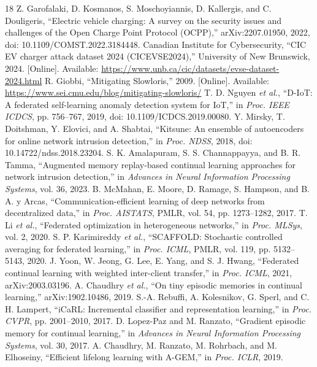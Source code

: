 \documentclass[journal,10pt]{IEEEtran}
\begin{document}
\begin{thebibliography}{18}
 Z. Garofalaki, D. Kosmanos, S. Moschoyiannis, D. Kallergis, and C. Douligeris, ``Electric vehicle charging: A survey on the security issues and challenges of the Open Charge Point Protocol (OCPP),'' arXiv:2207.01950, 2022, doi: 10.1109/COMST.2022.3184448.
 Canadian Institute for Cybersecurity, ``CIC EV charger attack dataset 2024 (CICEVSE2024),'' University of New Brunswick, 2024. [Online]. Available: \url{https://www.unb.ca/cic/datasets/evse-dataset-2024.html}
 R. Giobbi, ``Mitigating Slowloris,'' 2009. [Online]. Available: \url{https://www.sei.cmu.edu/blog/mitigating-slowloris/}
 T. D. Nguyen \emph{et al.}, ``D-IoT: A federated self-learning anomaly detection system for IoT,'' in \emph{Proc. IEEE ICDCS}, pp. 756--767, 2019, doi: 10.1109/ICDCS.2019.00080.
 Y. Mirsky, T. Doitshman, Y. Elovici, and A. Shabtai, ``Kitsune: An ensemble of autoencoders for online network intrusion detection,'' in \emph{Proc. NDSS}, 2018, doi: 10.14722/ndss.2018.23204.
 S. K. Amalapuram, S. S. Channappayya, and B. R. Tamma, ``Augmented memory replay-based continual learning approaches for network intrusion detection,'' in \emph{Advances in Neural Information Processing Systems}, vol. 36, 2023.
 B. McMahan, E. Moore, D. Ramage, S. Hampson, and B. A. y Arcas, ``Communication-efficient learning of deep networks from decentralized data,'' in \emph{Proc. AISTATS}, PMLR, vol. 54, pp. 1273--1282, 2017.
 T. Li \emph{et al.}, ``Federated optimization in heterogeneous networks,'' in \emph{Proc. MLSys}, vol. 2, 2020.
 S. P. Karimireddy \emph{et al.}, ``SCAFFOLD: Stochastic controlled averaging for federated learning,'' in \emph{Proc. ICML}, PMLR, vol. 119, pp. 5132--5143, 2020.
 J. Yoon, W. Jeong, G. Lee, E. Yang, and S. J. Hwang, ``Federated continual learning with weighted inter-client transfer,'' in \emph{Proc. ICML}, 2021, arXiv:2003.03196.
 A. Chaudhry \emph{et al.}, ``On tiny episodic memories in continual learning,'' arXiv:1902.10486, 2019.
 S.-A. Rebuffi, A. Kolesnikov, G. Sperl, and C. H. Lampert, ``iCaRL: Incremental classifier and representation learning,'' in \emph{Proc. CVPR}, pp. 2001--2010, 2017.
 D. Lopez-Paz and M. Ranzato, ``Gradient episodic memory for continual learning,'' in \emph{Advances in Neural Information Processing Systems}, vol. 30, 2017.
 A. Chaudhry, M. Ranzato, M. Rohrbach, and M. Elhoseiny, ``Efficient lifelong learning with A-GEM,'' in \emph{Proc. ICLR}, 2019.


\end{thebibliography}
\end{document}
